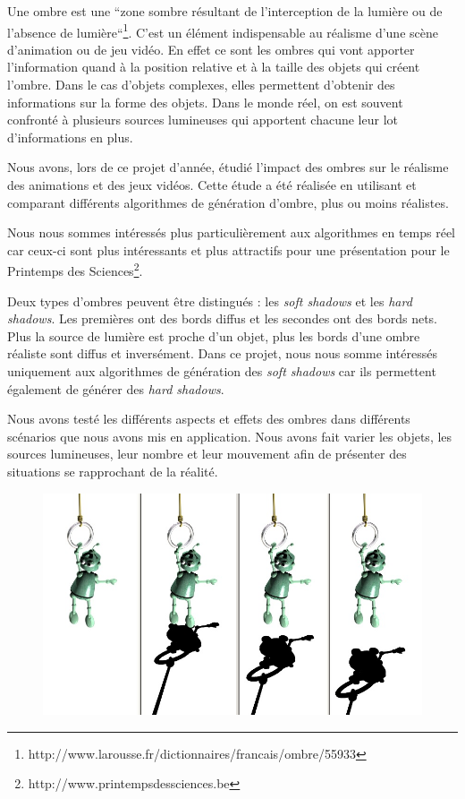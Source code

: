 \documentclass[a4paper,10pt]{report}
\begin{document}
Une ombre est une ``zone sombre résultant de l'interception de la lumière ou de l'absence de lumière``\footnote{http://www.larousse.fr/dictionnaires/francais/ombre/55933}. C'est un élément indispensable au réalisme d'une scène d'animation ou de jeu vidéo. En effet ce sont les ombres qui vont apporter l'information quand à la position relative et à la taille des objets qui créent l'ombre. Dans le cas d'objets complexes, elles permettent d'obtenir des informations sur la forme des objets.
Dans le monde réel, on est souvent confronté à plusieurs sources lumineuses qui apportent chacune leur lot d'informations en plus.


Nous avons, lors de ce projet d'année, étudié l'impact des ombres sur le réalisme des animations et des jeux vidéos. Cette étude a été réalisée en utilisant et comparant différents algorithmes de génération d'ombre, plus ou moins réalistes.


Nous nous sommes intéressés plus particulièrement aux algorithmes en temps réel car ceux-ci sont plus intéressants et plus attractifs pour une présentation pour le Printemps des Sciences\footnote{http://www.printempsdessciences.be}.

Deux types d'ombres peuvent être distingués : les \textit{soft shadows} et les \textit{hard shadows}. Les premières ont des bords diffus et les secondes ont des bords nets. Plus la source de lumière est proche d'un objet, plus les bords d'une ombre réaliste sont diffus et inversément.
Dans ce projet, nous nous somme intéressés uniquement aux algorithmes de génération des \textit{soft shadows} car ils permettent également de générer des \textit{hard shadows}.

Nous avons testé les différents aspects et effets des ombres dans différents scénarios que nous avons mis en application. Nous avons fait varier les objets, les sources lumineuses, leur nombre et leur mouvement afin de présenter des situations se rapprochant de la réalité.

\begin{figure}[H]
\includegraphics[scale=0.25]{images/relativePosition.jpg}
\centering
{}
\end{figure}
\end{document}

